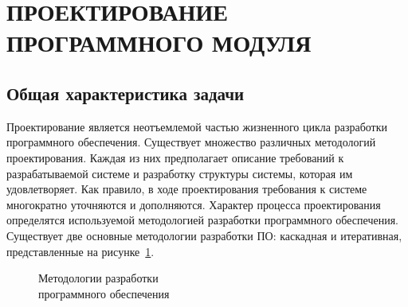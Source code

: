 \section[Проектирование программного модуля]{%
  ПРОЕКТИРОВАНИЕ ПРОГРАММНОГО МОДУЛЯ
}\label{sec:design}

\subsection{Общая характеристика задачи}

Проектирование является неотъемлемой частью жизненного цикла
разработки программного обеспечения.
Существует множество различных методологий проектирования.
Каждая из них предполагает описание требований к разрабатываемой системе
и разработку структуры системы, которая им удовлетворяет.
Как правило, в ходе проектирования требования к системе
многократно уточняются и дополняются.
Характер процесса проектирования определятся используемой
методологией разработки программного обеспечения.
Существует две основные методологии разработки ПО:
каскадная и итеративная, представленные на рисунке~\ref{fig:design_methods}.

\begin{figure}[h!]
  \centering
  \caption{Методологии разработки \\ программного обеспечения}
  \label{fig:design_methods}
\end{figure}

